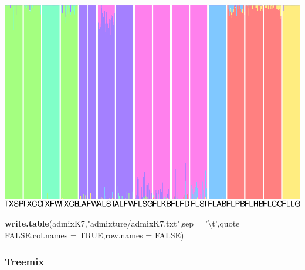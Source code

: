 \documentclass[]{article}
\newenvironment{Shaded}{\begin{snugshade}}{\end{snugshade}}
\newcommand{\KeywordTok}[1]{\textcolor[rgb]{0.13,0.29,0.53}{\textbf{#1}}}
\newcommand{\DataTypeTok}[1]{\textcolor[rgb]{0.13,0.29,0.53}{#1}}
\newcommand{\CharTok}[1]{\textcolor[rgb]{0.31,0.60,0.02}{#1}}
\newcommand{\StringTok}[1]{\textcolor[rgb]{0.31,0.60,0.02}{#1}}
\newcommand{\OtherTok}[1]{\textcolor[rgb]{0.56,0.35,0.01}{#1}}
\newcommand{\NormalTok}[1]{#1}
\begin{document}
\includegraphics{202_fwsw_reanalysis_files/figure-latex/unnamed-chunk-10-1}

\begin{Shaded}
\begin{Highlighting}[]
\KeywordTok{write.table}\NormalTok{(admixK7,}\StringTok{"admixture/admixK7.txt"}\NormalTok{,}\DataTypeTok{sep =} \StringTok{'}\CharTok{\textbackslash{}t}\StringTok{'}\NormalTok{,}\DataTypeTok{quote =} \OtherTok{FALSE}\NormalTok{,}\DataTypeTok{col.names =} \OtherTok{TRUE}\NormalTok{,}\DataTypeTok{row.names =} \OtherTok{FALSE}\NormalTok{)}
\end{Highlighting}
\end{Shaded}

\subsubsection{Treemix}\label{treemix}
\end{document}

